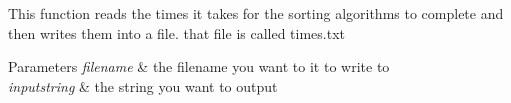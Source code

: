 This function reads the times it takes for the sorting algorithms to complete and then writes them into a file. that file is called times.\+txt


\begin{DoxyParams}{Parameters}
{\em filename} & the filename you want to it to write to \\
\hline
{\em inputstring} & the string you want to output \\
\hline
\end{DoxyParams}
